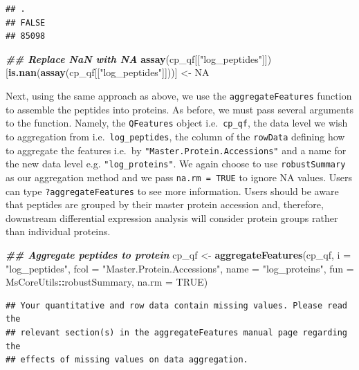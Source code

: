 \documentclass[9pt,a4paper,]{extarticle}
\newenvironment{Shaded}{\begin{snugshade}}{\end{snugshade}}
\newcommand{\AttributeTok}[1]{\textcolor[rgb]{0.13,0.29,0.53}{#1}}
\newcommand{\ConstantTok}[1]{\textcolor[rgb]{0.56,0.35,0.01}{#1}}
\newcommand{\DocumentationTok}[1]{\textcolor[rgb]{0.56,0.35,0.01}{\textbf{\textit{#1}}}}
\newcommand{\FunctionTok}[1]{\textcolor[rgb]{0.13,0.29,0.53}{\textbf{#1}}}
\newcommand{\NormalTok}[1]{#1}
\newcommand{\OtherTok}[1]{\textcolor[rgb]{0.56,0.35,0.01}{#1}}
\newcommand{\SpecialCharTok}[1]{\textcolor[rgb]{0.81,0.36,0.00}{\textbf{#1}}}
\newcommand{\StringTok}[1]{\textcolor[rgb]{0.31,0.60,0.02}{#1}}
\begin{document}
\begin{verbatim}
## .
## FALSE 
## 85098
\end{verbatim}

\begin{Shaded}
\begin{Highlighting}[]
\DocumentationTok{\#\# Replace NaN with NA}
\FunctionTok{assay}\NormalTok{(cp\_qf[[}\StringTok{"log\_peptides"}\NormalTok{]])[}\FunctionTok{is.nan}\NormalTok{(}\FunctionTok{assay}\NormalTok{(cp\_qf[[}\StringTok{"log\_peptides"}\NormalTok{]]))] }\OtherTok{\textless{}{-}} \ConstantTok{NA}
\end{Highlighting}
\end{Shaded}

Next, using the same approach as above, we use the \texttt{aggregateFeatures} function
to assemble the peptides into proteins. As before, we must pass several
arguments to the function. Namely, the \texttt{QFeatures} object i.e.~\texttt{cp\_qf}, the data
level we wish to aggregation from i.e.~\texttt{log\_peptides}, the column of the
\texttt{rowData} defining how to aggregate the features i.e.~by
\texttt{"Master.Protein.Accessions"} and a name for the new data level e.g.
\texttt{"log\_proteins"}. We again choose to use \texttt{robustSummary} as our aggregation
method and we pass \texttt{na.rm\ =\ TRUE} to ignore NA values. Users can type
\texttt{?aggregateFeatures} to see more information. Users should be aware that
peptides are grouped by their master protein accession and, therefore,
downstream differential expression analysis will consider protein groups rather
than individual proteins.

\begin{Shaded}
\begin{Highlighting}[]
\DocumentationTok{\#\# Aggregate peptides to protein}
\NormalTok{cp\_qf }\OtherTok{\textless{}{-}} \FunctionTok{aggregateFeatures}\NormalTok{(cp\_qf,}
                           \AttributeTok{i =} \StringTok{"log\_peptides"}\NormalTok{,}
                           \AttributeTok{fcol =} \StringTok{"Master.Protein.Accessions"}\NormalTok{,}
                           \AttributeTok{name =} \StringTok{"log\_proteins"}\NormalTok{,}
                           \AttributeTok{fun =}\NormalTok{ MsCoreUtils}\SpecialCharTok{::}\NormalTok{robustSummary,}
                           \AttributeTok{na.rm =} \ConstantTok{TRUE}\NormalTok{)}
\end{Highlighting}
\end{Shaded}

\begin{verbatim}
## Your quantitative and row data contain missing values. Please read the
## relevant section(s) in the aggregateFeatures manual page regarding the
## effects of missing values on data aggregation.
\end{verbatim}
\end{document}
